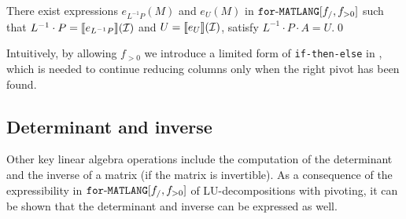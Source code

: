  \begin{proposition}\label{prop:palu}
There exist expressions $e_{L^{-1}P}(M)$ and $e_U(M)$ in $\texttt{for}\text{-}\texttt{MATLANG}[f_/,f_{>0}]$  such that
$L^{-1}\cdot P=\llbracket e_{L^{-1}P} \rrbracket(\mathcal{I})$ and $U=\llbracket e_U \rrbracket(\mathcal{I})$, satisfy $L^{-1}\cdot P\cdot A=U$.\qed
\end{proposition}
Intuitively, by allowing $f_{>0}$ we introduce a limited form of \texttt{if-then-else} in \langfor, which is needed
to continue reducing columns only when the right pivot has been found.


\subsection{Determinant and inverse}
Other key linear algebra operations include the computation of the determinant and
the inverse of a matrix (if the matrix is invertible). As a consequence of the expressibility
in $\texttt{for}\text{-}\texttt{MATLANG}[f_/,f_{>0}]$ of LU-decompositions with pivoting, it can be shown that the determinant
and inverse can be expressed as well. 

